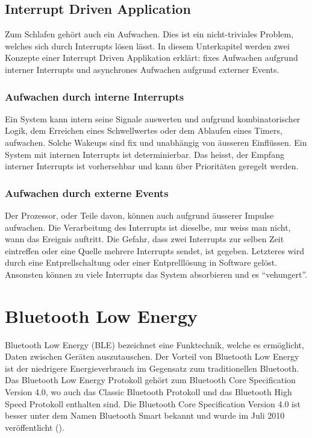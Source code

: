\subsection{Interrupt Driven Application}\label{pm_interrupt}

Zum Schlafen gehört auch ein Aufwachen. Dies ist ein nicht-triviales Problem, welches sich durch Interrupts lösen lässt. In diesem Unterkapitel werden zwei Konzepte einer Interrupt Driven Applikation erklärt: fixes Aufwachen aufgrund interner Interrupts und asynchrones Aufwachen aufgrund externer Events.

\subsubsection{Aufwachen durch interne Interrupts}

Ein System kann intern seine Signale auswerten und aufgrund kombinatorischer Logik, dem Erreichen eines Schwellwertes oder dem Ablaufen eines Timers, aufwachen. Solche Wakeups sind fix und unabhängig von äusseren Einflüssen. Ein System mit internen Interrupts ist determinierbar. Das heisst, der Empfang interner Interrupts ist vorhersehbar und kann über Prioritäten geregelt werden.

\subsubsection{Aufwachen durch externe Events}

Der Prozessor, oder Teile davon, können auch aufgrund äusserer Impulse aufwachen. Die Verarbeitung des Interrupts ist dieselbe, nur weiss man nicht, wann das Ereignis auftritt. Die Gefahr, dass zwei Interrupts zur selben Zeit eintreffen oder eine Quelle mehrere Interrupts sendet, ist gegeben. Letzteres wird durch eine Entprellschaltung oder einer Entprelllösung in Software gelöst. Ansonsten können zu viele Interrupts das System absorbieren und es ``vehungert''.

\section{Bluetooth Low Energy}\label{t_ble} 

Bluetooth Low Energy (BLE) bezeichnet eine Funktechnik, welche es ermöglicht, Daten zwischen Geräten auszutauschen. Der Vorteil von Bluetooth Low Energy ist der niedrigere Energieverbrauch im Gegensatz zum traditionellen Bluetooth. Das Bluetooth Low Energy Protokoll gehört zum Bluetooth Core Specification Version 4.0, wo auch das Classic Bluetooth Protokoll und das Bluetooth High Speed Protokoll enthalten sind. Die Bluetooth Core Specification Version 4.0 ist besser unter dem Namen Bluetooth Smart bekannt und wurde im Juli 2010 veröffentlicht (\cite{youtube_BLE}).

